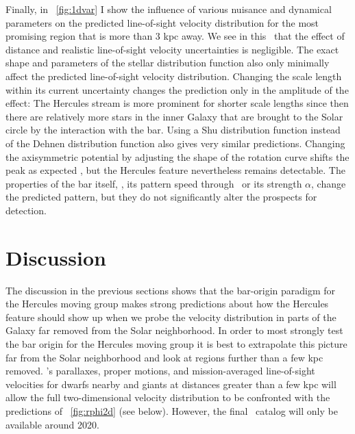 Finally, in \figurename~\ref{fig:1dvar} I show the influence of
various nuisance and dynamical parameters on the predicted
line-of-sight velocity distribution for the most promising region that
is more than 3 kpc away. We see in this \figurename\ that the effect
of distance and realistic line-of-sight velocity uncertainties is
negligible. The exact shape and parameters of the stellar distribution
function also only minimally affect the predicted line-of-sight
velocity distribution. Changing the scale length within its current
uncertainty changes the prediction only in the amplitude of the
effect: The Hercules stream is more prominent for shorter scale
lengths since then there are relatively more stars in the inner Galaxy
that are brought to the Solar circle by the interaction with the
bar. Using a Shu distribution function \citep{shu69a} instead of the
Dehnen distribution function also gives very similar
predictions. Changing the axisymmetric potential by adjusting the
shape of the rotation curve shifts the peak as expected
\citep[see][]{dehnen00a}, but the Hercules feature nevertheless
remains detectable. The properties of the bar itself, \eg, its pattern
speed through \Rolr\ or its strength $\alpha$, change the predicted
pattern, but they do not significantly alter the prospects for
detection.


\section{Discussion}

The discussion in the previous sections shows that the bar-origin
paradigm for the Hercules moving group makes strong predictions about
how the Hercules feature should show up when we probe the velocity
distribution in parts of the Galaxy far removed from the Solar
neighborhood. In order to most strongly test the bar origin for the
Hercules moving group it is best to extrapolate this picture far from
the Solar neighborhood and look at regions further than a few kpc
removed. \Gaia 's parallaxes, proper motions, and mission-averaged
line-of-sight velocities for dwarfs nearby and giants at distances
greater than a few kpc will allow the full two-dimensional velocity
distribution to be confronted with the predictions of
\figurename~\ref{fig:rphi2d} (see below). However, the final
\Gaia\ catalog will only be available around 2020.

